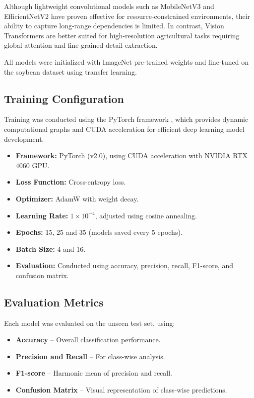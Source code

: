 \documentclass[preprint,12pt]{elsarticle}
\begin{document}
Although lightweight convolutional models such as MobileNetV3 \cite{Howard2020MobileNetV3} and EfficientNetV2 \cite{Tan2021Efficientnetv2} have proven effective for resource-constrained environments, their ability to capture long-range dependencies is limited. In contrast, Vision Transformers are better suited for high-resolution agricultural tasks requiring global attention and fine-grained detail extraction.

All models were initialized with ImageNet pre-trained weights and fine-tuned on the soybean dataset using transfer learning.

\subsection{Training Configuration}

Training was conducted using the PyTorch framework \cite{Paszke2019PyTorch}, which provides dynamic computational graphs and CUDA acceleration for efficient deep learning model development.

\begin{itemize}
  \item \textbf{Framework:} PyTorch (v2.0), using CUDA acceleration with NVIDIA RTX 4060 GPU.
  \item \textbf{Loss Function:} Cross-entropy loss.
  \item \textbf{Optimizer:} AdamW with weight decay.
  \item \textbf{Learning Rate:} $1 \times 10^{-4}$, adjusted using cosine annealing.
  \item \textbf{Epochs:} 15, 25 and 35 (models saved every 5 epochs).
  \item \textbf{Batch Size:} 4 and 16.
  \item \textbf{Evaluation:} Conducted using accuracy, precision, recall, F1-score, and confusion matrix.
\end{itemize}

\subsection{Evaluation Metrics}

Each model was evaluated on the unseen test set, using:
\begin{itemize}
  \item \textbf{Accuracy} – Overall classification performance.
  \item \textbf{Precision and Recall} – For class-wise analysis.
  \item \textbf{F1-score} – Harmonic mean of precision and recall.
  \item \textbf{Confusion Matrix} – Visual representation of class-wise predictions.
\end{itemize}
\end{document}
